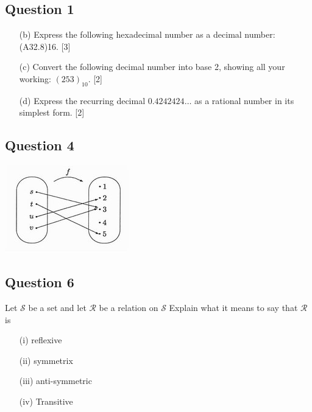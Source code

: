 \documentclass[]{report}
\begin{document}

\subsection*{Question 1}
\begin{itemize}
	\item[(b)] Express the following hexadecimal number as a decimal number: (A32.8)16.
	[3]
	\item[(c)]  Convert the following decimal number into base 2, showing all your working:
	$(253)_{10}$. [2]
	\item[(d)]  Express the recurring decimal $0.4242424\ldots$
	as a rational number in its simplest
	form. [2]
\end{itemize}
\subsection*{Question 4}
\begin{center}
	\includegraphics[scale=0.55]{HibCollArrow.jpg}
\end{center}

\subsection*{Question 6}
Let $\mathcal{S}$ be a set and let $\mathcal{R}$ be a relation on $\mathcal{S}$
Explain what it means to say that $\mathcal{R}$ is

\begin{itemize}
	\item[(i)] reflexive
	\item[(ii)] symmetrix
	\item[(iii)] anti-symmetric
	\item[(iv)] Transitive
\end{itemize}
\end{document}
